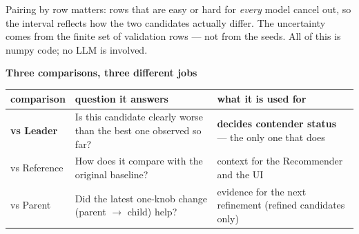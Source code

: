 \documentclass[11pt]{article}
\begin{document}
\begin{center}
\end{center}

{\small Pairing by row matters: rows that are easy or hard for \emph{every} model cancel out, so the interval
reflects how the two candidates actually differ. The uncertainty comes from the finite set of validation
rows --- not from the seeds. All of this is numpy code; no LLM is involved.}

\vspace{6pt}
\textbf{Three comparisons, three different jobs}\par\vspace{3pt}
{\small
\begin{tabularx}{\linewidth}{@{}l Y Y@{}}
\toprule
\textbf{comparison} & \textbf{question it answers} & \textbf{what it is used for}\\ \midrule
\textbf{vs Leader} & Is this candidate clearly worse than the best one observed so far? & \textbf{decides contender status} --- the only one that does\\
vs Reference & How does it compare with the original baseline? & context for the Recommender and the UI\\
vs Parent & Did the latest one-knob change (parent $\rightarrow$ child) help? & evidence for the next refinement (refined candidates only)\\
\bottomrule
\end{tabularx}}
\end{document}
